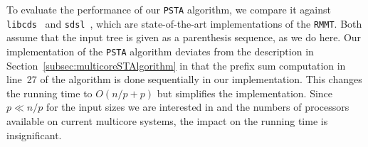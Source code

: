 To evaluate the performance of our {\tt PSTA} algorithm, we compare it against
{\tt libcds}~\cite{libcds} and {\tt sdsl}~\cite{sdsl}, which are
state-of-the-art implementations of the {\tt RMMT}.
Both assume that the input tree is given as a parenthesis sequence, as we do
here.
Our implementation of the {\tt PSTA} algorithm deviates from the description in
Section~\ref{subsec:multicoreSTAlgorithm} in that the prefix sum computation in
line~27 of the algorithm is done sequentially in our implementation.
This changes the running time to $O(n/p + p)$ but simplifies the implementation.
Since $p \ll n/p$ for the input sizes we are interested in and the numbers of
processors available on current multicore systems, the impact on the running
time is insignificant.
